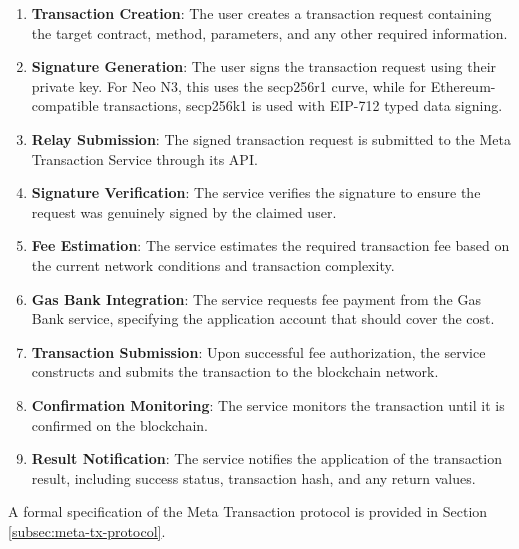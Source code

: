 \documentclass[12pt,a4paper]{article}
\begin{document}
\begin{enumerate}
    \item \textbf{Transaction Creation}: The user creates a transaction request containing the target contract, method, parameters, and any other required information.
    
    \item \textbf{Signature Generation}: The user signs the transaction request using their private key. For Neo N3, this uses the secp256r1 curve, while for Ethereum-compatible transactions, secp256k1 is used with EIP-712 typed data signing.
    
    \item \textbf{Relay Submission}: The signed transaction request is submitted to the Meta Transaction Service through its API.
    
    \item \textbf{Signature Verification}: The service verifies the signature to ensure the request was genuinely signed by the claimed user.
    
    \item \textbf{Fee Estimation}: The service estimates the required transaction fee based on the current network conditions and transaction complexity.
    
    \item \textbf{Gas Bank Integration}: The service requests fee payment from the Gas Bank service, specifying the application account that should cover the cost.
    
    \item \textbf{Transaction Submission}: Upon successful fee authorization, the service constructs and submits the transaction to the blockchain network.
    
    \item \textbf{Confirmation Monitoring}: The service monitors the transaction until it is confirmed on the blockchain.
    
    \item \textbf{Result Notification}: The service notifies the application of the transaction result, including success status, transaction hash, and any return values.
\end{enumerate}

A formal specification of the Meta Transaction protocol is provided in Section \ref{subsec:meta-tx-protocol}.


\end{document}
